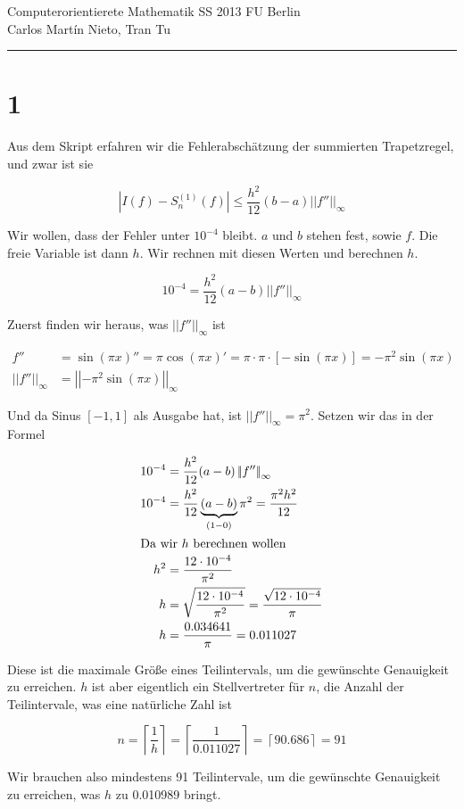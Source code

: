 \documentclass[ngerman,a4paper]{scrartcl}
\newcommand{\norm}[1]{\left|\!\left|#1\right|\! \right|}
\begin{document}
{\sffamily
  \hfill
  Computerorientierete Mathematik SS 2013\hfill
  FU Berlin\\[8pt]
  \hfill Carlos Martín Nieto, Tran Tu\hrule \bigskip
}

\section*{1}

Aus dem Skript erfahren wir die Fehlerabschätzung der summierten Trapetzregel, und zwar ist sie

\[
|I(f) - S^{(1)}_n(f)| \leq \frac{h^2}{12}(b-a)\norm{f''}_\infty
\]

Wir wollen, dass der Fehler unter $10^{-4}$ bleibt. $a$ und $b$ stehen fest, sowie $f$. Die freie Variable ist dann $h$. Wir rechnen mit diesen Werten und berechnen $h$.

\[
  10^{-4} = \frac{h^2}{12} (a-b) \norm{f''}_\infty
\]

Zuerst finden wir heraus, was $\norm{f''}_\infty$ ist


\begin{align*}
  f'' &= \sin(\pi x)'' = \pi \cos(\pi x)' = \pi \cdot \pi \cdot       [-\sin(\pi x)] = -\pi^2 \sin(\pi x)\\
\norm{f''}_\infty &= \norm{-\pi^2 \sin(\pi x)}_\infty
\end{align*}

Und da Sinus $[-1, 1]$ als Ausgabe hat, ist $\norm{f''}_\infty = \pi^2$. Setzen wir das in der Formel

\begin{align*}
  10^{-4} &= \frac{h^2}{12} (a-b) \norm{f''}_\infty\\
  10^{-4} &= \frac{h^2}{12} \underbrace{(a-b)}_{(1 - 0)} \pi^2 = \frac{\pi^2 h^2}{12}\\
\intertext{Da wir $h$ berechnen wollen}
h^2 &= \frac{12\cdot 10^{-4}}{\pi^2}\\
h &= \sqrt{\frac{12\cdot 10^{-4}}{\pi^2}} = \frac{\sqrt{12\cdot 10^{-4}}}{\pi}\\
h &= \frac{0.034641}{\pi} = 0.011027
\end{align*}

Diese ist die maximale Größe eines Teilintervals, um die gewünschte Genauigkeit zu erreichen. $h$ ist aber eigentlich ein Stellvertreter für $n$, die Anzahl der Teilintervale, was eine natürliche Zahl ist

\[
n = \left\lceil \frac{1}{h} \right\rceil = \left\lceil \frac{1}{0.011027} \right\rceil = \left\lceil 90.686 \right\rceil = 91
\]

Wir brauchen also mindestens 91 Teilintervale, um die gewünschte Genauigkeit zu erreichen, was $h$ zu 0.010989 bringt.
\end{document}
